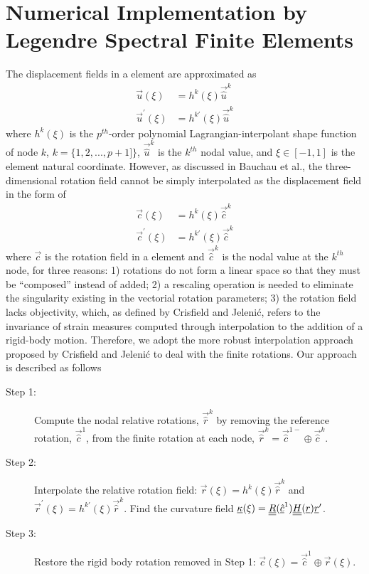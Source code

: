 \section{Numerical Implementation by Legendre Spectral Finite Elements}
The displacement fields in a element are approximated as
\begin{align}
    \label{InterpolateDisp}
    \vec{u}(\xi) &= h^k(\xi) \vec{\hat{u}}^k \\
    \label{InterpolateDispp}
    \vec{u}^\prime(\xi) &= h^{k\prime}(\xi) \vec{\hat{u}}^k
\end{align}
where $h^k(\xi)$ is the $p^{th}$-order polynomial
Lagrangian-interpolant shape function of node $k$, $k=\{1,2,...,p+1]\}$, 
$\vec{\hat{u}}^k$ is
the $k^{th}$ nodal value, and $\xi \in \left[-1,1\right]$ is the element
natural coordinate.
However, as discussed in Bauchau et al.\cite{Bauchau-etal:2009}, the three-dimensional rotation field cannot be
simply interpolated as the displacement field in the form of
\begin{align}
    \label{InterpolateRot}
    \vec{c}(\xi) &= h^k(\xi) \vec{\hat{c}}^k \\
    \label{InterpolateRotp}
    \vec{c}^\prime(\xi) &= h^{k \prime}(\xi) \vec{\hat{c}}^k 
\end{align}    
where $\vec{c}$ is the rotation field in a element and $\vec{\hat{c}}^k$ is
the nodal value at the $k^{th}$ node, for three reasons: 1) rotations do not
form a linear space so that they must be  ``composed'' instead of added; 2)
a rescaling operation is needed to eliminate the singularity existing in the
vectorial rotation parameters; 3) the rotation field lacks objectivity,
which, as
defined by Crisfield and Jeleni\'c\cite{Crisfield1999}, refers to the
invariance of strain measures computed through interpolation to the addition
of a rigid-body motion. Therefore, we adopt the more robust interpolation
approach proposed by Crisfield and Jeleni\'c \cite{Crisfield1999} to deal
with the finite rotations. Our approach is described as follows
\begin{description}
    \item[Step 1:] Compute the nodal relative rotations, $\vec{\hat{r}}^k$
by removing the reference rotation, $\vec{\hat{c}}^1$, from the finite rotation at each node, $\vec{\hat{r}}^k = \vec{\hat{c}}^{1-} \oplus \vec{\hat{c}}^k$.
    \item[Step 2:] Interpolate the relative rotation field: $\vec{r}(\xi) = h^k(\xi) \vec{\hat{r}}^k$ and $\vec{r}^\prime(\xi) = h^{k \prime}(\xi) \vec{\hat{r}}^k$. Find the curvature field $\underline{\kappa}(\xi) = \underline{\underline{R}}(\underline{\hat{c}}^1) \underline{\underline{H}}(\underline{r}) \underline{r}^\prime$.
    \item[Step 3:] Restore the rigid body rotation removed in Step 1: $\vec{c}(\xi) = \vec{\hat{c}}^1 \oplus \vec{r}(\xi)$.
\end{description} 
